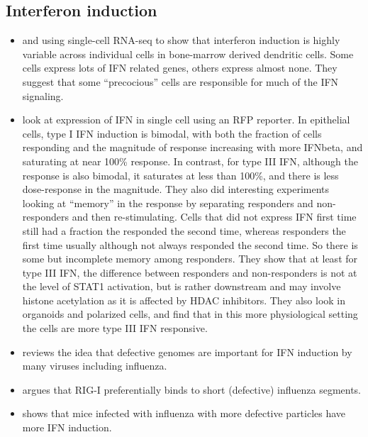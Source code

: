 \documentclass[9pt,lineno]{elife}
\begin{document}
\subsection{Interferon induction}
\begin{itemize}

\item \citet{shalek2013single} and \citet{shalek2014single} using single-cell RNA-seq to show that interferon induction is highly variable across individual cells in bone-marrow derived dendritic cells.
Some cells express lots of IFN related genes, others express almost none.
They suggest that some ``precocious'' cells are responsible for much of the IFN signaling.

\item \citet{bhushal2017cell} look at expression of IFN in single cell using an RFP reporter.
In epithelial cells, type I IFN induction is bimodal, with both the fraction of cells responding and the magnitude of response increasing with more IFNbeta, and saturating at near 100\% response.
In contrast, for type III IFN, although the response is also bimodal, it saturates at less than 100\%, and there is less dose-response in the magnitude.
They also did interesting experiments looking at ``memory'' in the response by separating responders and non-responders and then re-stimulating.
Cells that did not express IFN first time still had a fraction the responded the second time, whereas responders the first time usually although not always responded the second time.
So there is some but incomplete memory among responders.
They show that at least for type III IFN, the difference between responders and non-responders is not at the level of STAT1 activation, but is rather downstream and may involve histone acetylation as it is affected by HDAC inhibitors.
They also look in organoids and polarized cells, and find that in this more physiological setting the cells are more type III IFN responsive.

\item \citet{lopez2014defective} reviews the idea that defective genomes are important for IFN induction by many viruses including influenza.

\item \citet{baum2010preference} argues that RIG-I preferentially binds to short (defective) influenza segments.

\item \citet{tapia2013defective} shows that mice infected with influenza with more defective particles have more IFN induction.

\end{itemize}
\end{document}
